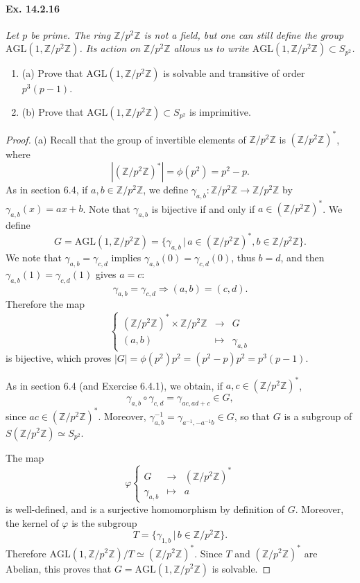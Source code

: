 \documentclass[11pt,a4paper]{article}
\newcommand{\be} {\begin{enumerate}}
\newcommand{\ee} {\end{enumerate}}
\newcommand{\Z}{\mathbb{Z}}
\begin{document}
 \paragraph{Ex. 14.2.16}{\it Let $p$ be prime. The ring $\Z/p^2\Z$ is not a field, but one can still define the group $\mathrm{AGL}(1,\Z/p^2\Z)$. Its action on $\Z/p^2\Z$ allows us to write $\mathrm{AGL}(1,\Z/p^2\Z) \subset S_{p^2}$.
 \be
\item[(a)] Prove that $\mathrm{AGL}(1,\Z/p^2\Z)$ is solvable and transitive of order $p^3(p-1)$.
\item[(b)] Prove that $\mathrm{AGL}(1,\Z/p^2\Z) \subset S_{p^2}$ is imprimitive.
\ee
}
\begin{proof}
\item[(a)] Recall that the group of invertible elements of $\Z/p^2\Z$ is $(\Z/p^2\Z)^*$, where $$|(\Z/p^2\Z)^*| = \phi(p^2) = p^2 - p.$$
As in section 6.4, if $a,b \in \Z/p^2\Z$, we define $\gamma_{a,b} : \Z/p^2\Z \to \Z/p^2\Z$ by $\gamma_{a,b}(x) = ax +b$. Note that $\gamma_{a,b}$ is bijective if and only if $a \in (\Z/p^2\Z)^*$.
We define
$$G = \mathrm{AGL}(1,\Z/p^2\Z) = \{\gamma_{a,b} \, | \, a \in (\Z/p^2\Z)^*, b \in \Z/p^2\Z\}.$$
We note that $\gamma_{a,b} = \gamma_{c,d}$ implies $\gamma_{a,b} (0)= \gamma_{c,d}(0)$, thus $b = d$, and then $\gamma_{a,b} (1)= \gamma_{c,d}(1)$ gives $a =c$:
$$\gamma_{a,b} = \gamma_{c,d} \Rightarrow (a,b) = (c,d).$$
Therefore the map
$$
\left\{
\begin{array}{ccc}
(\Z/p^2\Z)^* \times  \Z/p^2\Z & \to & G\\
(a,b) &\mapsto & \gamma_{a,b}
\end{array}
\right.
$$
is bijective, which proves $|G| = \phi(p^2) p^2 = (p^2-p)p^2 = p^3(p-1)$.

As in section 6.4 (and Exercise 6.4.1), we obtain, if $a,c \in (\Z/p^2\Z)^*$,
$$\gamma_{a,b} \circ \gamma_{c,d} = \gamma_{ac,ad+c} \in G,$$
since $ac \in (\Z/p^2\Z)^*$. Moreover, $\gamma_{a,b}^{-1} = \gamma_{a^{-1}, -a^{-1}b} \in G$, so that $G$ is a subgroup of $S(\Z/p^2\Z) \simeq S_{p^2}$.

The map 
$$
\varphi \left\{
\begin{array}{ccc}
G & \to & (\Z/p^2\Z)^*\\
\gamma_{a,b} &\mapsto & a
\end{array}
\right.
$$
is well-defined, and is a surjective homomorphism by definition of $G$. Moreover, the kernel of $\varphi$ is the subgroup
$$T = \{\gamma_{1,b}\, | \, b \in \Z/p^2\Z\}.$$
Therefore $ \mathrm{AGL}(1,\Z/p^2\Z)/T \simeq (\Z/p^2\Z)^*$. Since $T$ and $ (\Z/p^2\Z)^*$ are Abelian, this proves that $G = \mathrm{AGL}(1,\Z/p^2\Z)$ is solvable.


\end{proof}
\end{document}
